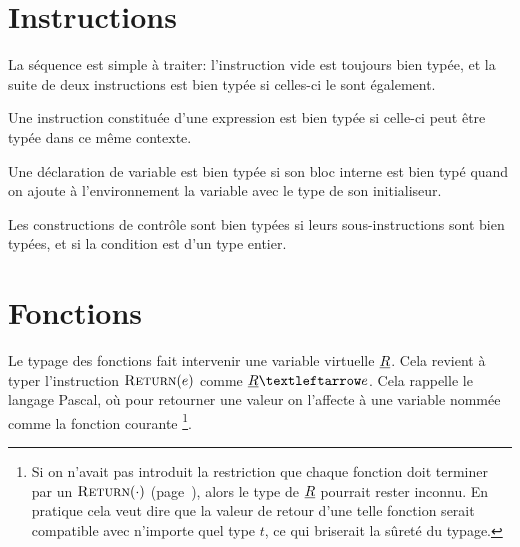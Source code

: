 \begin{mathpar}
\end{mathpar}

\section{Instructions}

La séquence est simple à traiter: l'instruction vide est toujours bien typée,
et la suite de deux instructions est bien typée si celles-ci le sont également.

\begin{mathpar}

\end{mathpar}

Une instruction constituée d'une expression est bien typée si celle-ci peut être
typée dans ce même contexte.

\begin{mathpar}
\end{mathpar}

Une déclaration de variable est bien typée si son bloc interne est bien typé
quand on ajoute à l'environnement la variable avec le type de son initialiseur.

\begin{mathpar}
\end{mathpar}

Les constructions de contrôle sont bien typées si leurs sous-instructions sont
bien typées, et si la condition est d'un type entier.

\begin{mathpar}

\end{mathpar}

\section{Fonctions}

Le typage des fonctions fait intervenir une variable virtuelle $\vRet$. Cela
revient à typer l'instruction $\iReturn{e}$ comme $\vRet ← e$. Cela rappelle le
langage Pascal, où pour retourner une valeur on l'affecte à une variable nommée
comme la fonction courante
\footnote{
    Si on n'avait pas introduit la restriction que chaque fonction doit terminer
    par un $\iReturn{\cdot}$ (page~\pageref{page:return-fonction}), alors le type de
    $\vRet$ pourrait rester inconnu. En pratique cela veut dire que la valeur de
    retour d'une telle fonction serait compatible avec n'importe quel type $t$, ce
    qui briserait la sûreté du typage.
}.

